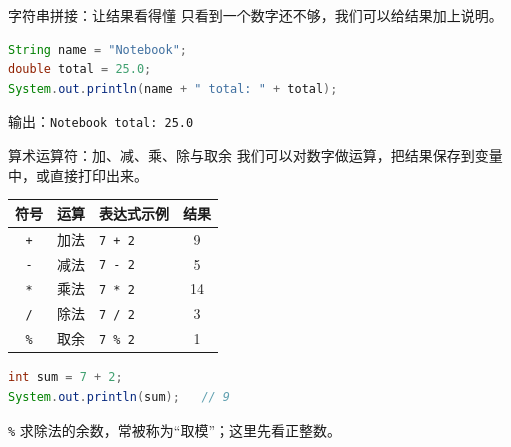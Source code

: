 \documentclass[aspectratio=169]{beamer}
\begin{document}
\begin{frame}[fragile]{字符串拼接：让结果看得懂}
  只看到一个数字还不够，我们可以给结果加上说明。
  \begin{lstlisting}[language=Java]
String name = "Notebook";
double total = 25.0;
System.out.println(name + " total: " + total);
  \end{lstlisting}
  输出：\quad \texttt{Notebook total: 25.0}
\end{frame}

\begin{frame}[fragile]{算术运算符：加、减、乘、除与取余}
  我们可以对数字做运算，把结果保存到变量中，或直接打印出来。
  \begin{center}
    \renewcommand{\arraystretch}{1.15}
    \begin{tabular}{cllc}
      \textbf{符号} & \textbf{运算} & \textbf{表达式示例} & \textbf{结果} \\
      \hline
      \texttt{+} & 加法 & \texttt{7 + 2} & 9 \\
      \texttt{-} & 减法 & \texttt{7 - 2} & 5 \\
      \texttt{*} & 乘法 & \texttt{7 * 2} & 14 \\
      \texttt{/} & 除法 & \texttt{7 / 2} & 3 \\
      \texttt{\%} & 取余 & \texttt{7 \% 2} & 1 \\
    \end{tabular}
  \end{center}
  \begin{lstlisting}[language=Java]
int sum = 7 + 2;
System.out.println(sum);   // 9
  \end{lstlisting}
  \texttt{\%} 求除法的余数，常被称为“取模”；这里先看正整数。
\end{frame}

\end{document}
